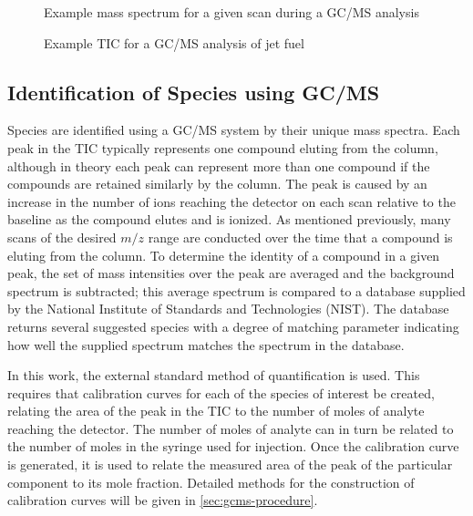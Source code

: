 \documentclass[../main.tex]{subfiles}
\begin{document}
\begin{figure}
    \begin{floatrow}
            {\caption{Example mass spectrum for a given scan during a GC/MS analysis}
            \label{fig:gcms-mass-spec}}
            {\caption{Example TIC for a GC/MS analysis of jet fuel}
            \label{fig:gcms-tic}}
    \end{floatrow}
\end{figure}

\subsection{Identification of Species using GC/MS}

Species are identified using a GC/MS system by their unique mass spectra.
Each peak in the TIC typically represents one compound eluting from the
column, although in theory each peak can represent more than one compound
if the compounds are retained similarly by the column. The peak is caused
by an increase in the number of ions reaching the detector on each scan
relative to the baseline as the compound elutes and is ionized. As
mentioned previously, many scans of the desired $m/z$ range are
conducted over the time that a compound is eluting from the column.
To determine the identity of a compound in a given peak, the set of
mass intensities over the peak are averaged and the background
spectrum is subtracted; this average spectrum is compared to a
database supplied by the National Institute of Standards and
Technologies (NIST). The database returns several suggested species
with a degree of matching parameter indicating how well the supplied
spectrum matches the spectrum in the database.

In this work, the external standard method of quantification is used.
This requires that calibration curves for each of the species of
interest be created, relating the area of the peak in the TIC to
the number of moles of analyte reaching the detector. The number of
moles of analyte can in turn be related to the number of moles in the
syringe used for injection. Once the
calibration curve is generated, it is used to relate the measured
area of the peak of the particular component to its mole fraction. Detailed
methods for the construction of calibration curves will be given in
\cref{sec:gcms-procedure}.
\end{document}
